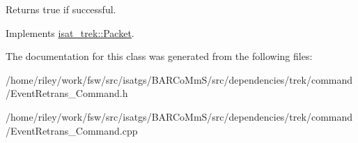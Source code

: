 \begin{DoxyReturn}{Returns}
true if successful. 
\end{DoxyReturn}


Implements \hyperlink{classisat__trek_1_1_packet}{isat\+\_\+trek\+::\+Packet}.



The documentation for this class was generated from the following files\+:\begin{DoxyCompactItemize}
\item 
/home/riley/work/fsw/src/isatgs/\+B\+A\+R\+Co\+Mm\+S/src/dependencies/trek/command/Event\+Retrans\+\_\+\+Command.\+h\item 
/home/riley/work/fsw/src/isatgs/\+B\+A\+R\+Co\+Mm\+S/src/dependencies/trek/command/Event\+Retrans\+\_\+\+Command.\+cpp\end{DoxyCompactItemize}
